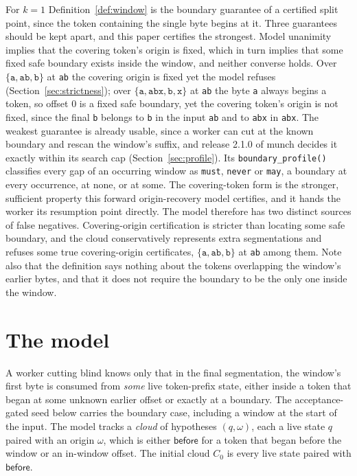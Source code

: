 \documentclass[11pt,a4paper]{article}
\theoremstyle{definition}
\theoremstyle{plain}
\newcommand{\code}[1]{\texttt{#1}}
\newcommand{\before}{\mathsf{before}}
\begin{document}
For $k = 1$ Definition~\ref{def:window} is the boundary guarantee of a certified split point, since the token containing
the single byte begins at it. Three guarantees should be kept apart, and this paper certifies the strongest. Model
unanimity implies that the covering token's origin is fixed, which in turn implies that some fixed safe boundary exists
inside the window, and neither converse holds. Over $\{\code{a}, \code{ab}, \code{b}\}$ at \code{ab} the covering origin
is fixed yet the model refuses (Section~\ref{sec:strictness}); over $\{\code{a}, \code{abx}, \code{b}, \code{x}\}$ at
\code{ab} the byte \code{a} always begins a token, so offset $0$ is a fixed safe boundary, yet the covering token's
origin is not fixed, since the final \code{b} belongs to \code{b} in the input \code{ab} and to \code{abx} in
\code{abx}. The weakest guarantee is already usable, since a worker can cut at the known boundary and rescan the
window's suffix, and release 2.1.0 of munch decides it exactly within its search cap (Section~\ref{sec:profile}). Its
\code{boundary\_profile()} classifies every gap of an occurring window as \code{must}, \code{never} or \code{may}, a
boundary at every occurrence, at none, or at some. The covering-token form is the stronger, sufficient property this
forward origin-recovery model certifies, and it hands the worker its resumption point directly. The model therefore has
two distinct sources of false negatives. Covering-origin certification is stricter than locating some safe boundary, and
the cloud conservatively represents extra segmentations and refuses some true covering-origin certificates,
$\{\code{a}, \code{ab}, \code{b}\}$ at \code{ab} among them. Note also that the definition says nothing about the tokens
overlapping the window's earlier bytes, and that it does not require the boundary to be the only one inside the window.

\section{The model}
\label{sec:model}

A worker cutting blind knows only that in the final segmentation, the window's first byte is consumed from \emph{some}
live token-prefix state, either inside a token that began at some unknown earlier offset or exactly at a boundary. The
acceptance-gated seed below carries the boundary case, including a window at the start of the input. The model tracks a
\emph{cloud} of hypotheses $(q, \omega)$, each a live state $q$ paired with an origin $\omega$, which is either
$\before$ for a token that began before the window or an in-window offset. The initial cloud $C_0$ is every live state
paired with $\before$.
\end{document}
